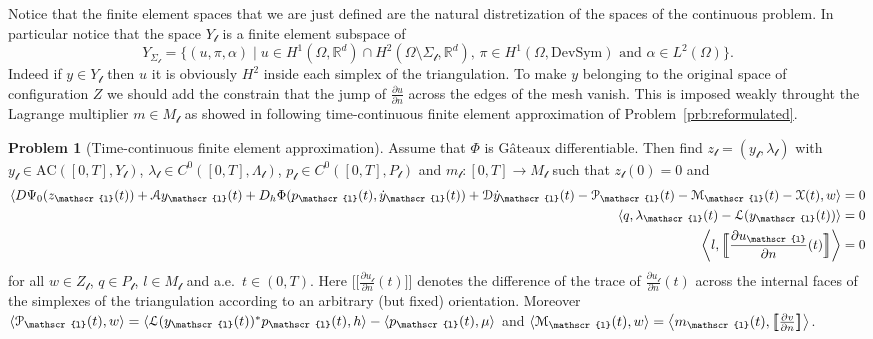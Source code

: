 \documentclass[a4paper,10pt,oneside]{amsbook}
\numberwithin{section}{chapter}
\numberwithin{equation}{chapter}
\theoremstyle{definition}
\newtheorem{prb}[prop]{Problem}
\DeclarePairedDelimiter{\dual}{\langle}{\rangle}
\newcommand{\dind}[2]{\frac{\partial #1}{\partial #2}}
\begin{document}
Notice that the finite element spaces that we are just defined are the natural distretization of the spaces of the continuous problem. In particular notice that the space $Y_\mathscr{l}$ is a finite element subspace of
\[
Y_{\Sigma_\mathscr{l}}=\{(u,\pi,\alpha)\;|\;\text{$u\in H^1(\Omega,\mathbb{R}^d)\cap H^2(\Omega\setminus\Sigma_\mathscr{l},\mathbb{R}^d)$, $\pi\in H^1(\Omega,\text{DevSym})$ and $\alpha\in L^2(\Omega)$}\}.
\]
Indeed if $y\in Y_\mathscr{l}$ then $u$ it is obviously $H^2$ inside each simplex of the triangulation. To make $y$ belonging to the original space of configuration $Z$ we should add the constrain that the jump of $\dind{u}{n}$ across the edges of the mesh vanish. This is imposed weakly throught the Lagrange multiplier $m\in M_\mathscr{l}$
as showed in following time-continuous finite element approximation of Problem~\ref{prb:reformulated}. \begin{prb}[Time-continuous finite element approximation]
\label{prb:fem}
Assume that $\Phi$ is G\^ateaux differentiable. Then find $z_\mathscr{l}=(y_\mathscr{l},\lambda_\mathscr{l})$ with $y_\mathscr{l}\in\text{AC}([0,T],Y_\mathscr{l})$, $\lambda_\mathscr{l}\in C^0([0,T],\Lambda_\mathscr{l})$, $p_\mathscr{l}\in C^0([0,T],P_\mathscr{l})$ and $m_\mathscr{l}\colon[0,T]\to M_\mathscr{l}$ such that $z_\mathscr{l}(0)=0$ and
\begin{align}
\dual{D\Psi_0(z_\mathscr{l}(t))+\mathcal{A}y_\mathscr{l}(t)+D_h\Phi(p_\mathscr{l}(t),\dot y_\mathscr{l}(t))+\mathcal{D}\dot y_\mathscr{l}(t)-\mathcal{P}_\mathscr{l}(t)-\mathcal{M}_\mathscr{l}(t)-\mathcal{X}(t),w}&=0 \\
\dual{q,\lambda_\mathscr{l}(t)-\mathcal{L}(y_\mathscr{l}(t))}&=0 \\
\left\langle l,\Big[\!\!\Big[\dind{u_\mathscr{l}}{n}(t)\Big]\!\!\Big]\right\rangle&=0
\end{align}
for all $w\in Z_\mathscr{l}$, $q\in P_\mathscr{l}$, $l\in M_\mathscr{l}$ and a.e.\ $t\in(0,T)$. Here $\big[\!\!\big[\dind{u_\mathscr{l}}{n}(t)\big]\!\!\big]$ denotes the difference of the trace of $\dind{u_\mathscr{l}}{n}(t)$ across the internal faces of the simplexes of the triangulation according to an arbitrary (but fixed) orientation. Moreover $\dual{\mathcal{P}_\mathscr{l}(t),w}=\dual{\mathcal{L}(y_\mathscr{l}(t))^*p_\mathscr{l}(t),h}-\dual{p_\mathscr{l}(t),\mu}$ and $\dual{\mathcal{M}_\mathscr{l}(t),w}=\left\langle m_\mathscr{l}(t),\big[\!\!\big[\dind{v}{n}\big]\!\!\big]\right\rangle$.
\end{prb}
\end{document}
